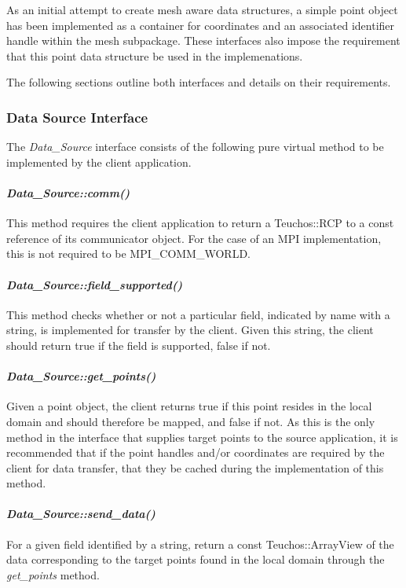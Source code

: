 \documentclass[letterpaper]{article}
\begin{document}
As an initial attempt to create mesh aware data structures, a simple
point object has been implemented as a container for coordinates and
an associated identifier handle within the mesh subpackage. These
interfaces also impose the requirement that this point data structure
be used in the implemenations.

The following sections outline both interfaces and details on their
requirements. 

\subsubsection{Data Source Interface}

The {\sl Data\_Source} interface consists of the following pure
virtual method to be implemented by the client application.

\paragraph{\sl Data\_Source::comm()}
This method requires the client application to return a Teuchos::RCP
to a const reference of its communicator object. For the case of an
MPI implementation, this is not required to be MPI_COMM_WORLD.

\paragraph{\sl Data\_Source::field\_supported()}
This method checks whether or not a particular field, indicated by
name with a string, is implemented for transfer by the client. Given
this string, the client should return true if the field is supported,
false if not.

\paragraph{\sl Data\_Source::get\_points()}
Given a point object, the client returns true if this point resides in
the local domain and should therefore be mapped, and false if not. As
this is the only method in the interface that supplies target points
to the source application, it is recommended that if the point handles
and/or coordinates are required by the client for data transfer, that
they be cached during the implementation of this method.

\paragraph{\sl Data\_Source::send\_data()}
For a given field identified by a string, return a const
Teuchos::ArrayView of the data corresponding to the target points
found in the local domain through the {\sl get\_points} method.
\end{document}
